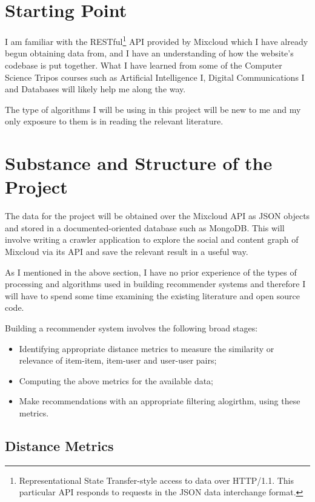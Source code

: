 \section{Starting Point}

I am familiar with the RESTful\footnote{Representational State Transfer-style access to data over HTTP/1.1. This particular API responds to requests in the JSON data interchange format.} API provided by Mixcloud which I have already begun obtaining data from, and I have an understanding of how the website's codebase is put together. What I have learned from some of the Computer Science Tripos courses such as Artificial Intelligence I, Digital Communications I and Databases will likely help me along the way.

The type of algorithms I will be using in this project will be new to me and my only exposure to them is in reading the relevant literature.
  
\section{Substance and Structure of the Project}

The data for the project will be obtained over the Mixcloud API as JSON objects and stored in a documented-oriented database such as MongoDB. This will involve writing a crawler application to explore the social and content graph of Mixcloud via its API and save the relevant result in a useful way.

As I mentioned in the above section, I have no prior experience of the types of processing and algorithms used in building recommender systems and therefore I will have to spend some time examining the existing literature and open source code.

Building a recommender system involves the following broad stages: 
\begin{itemize}
 \item Identifying appropriate distance metrics to measure the similarity or relevance of item-item, item-user and user-user pairs;
 \item Computing the above metrics for the available data;
 \item Make recommendations with an appropriate filtering alogirthm, using these metrics.
\end{itemize}

\subsection*{Distance Metrics}

